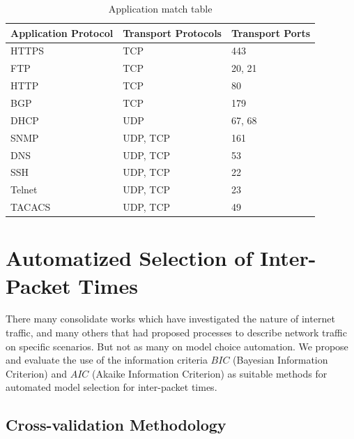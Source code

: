 \begin{table}[ht!]
    \centering
    \caption{Application match table}
    \label{tab:application-protocols}
    \begin{tabular}{lll}
        \hline
        Application Protocol & Transport Protocols & Transport Ports \\ \hline
        \acrshort{HTTPS}               & TCP                & 443             \\
        FTP                 & TCP                & 20, 21          \\
        HTTP                & TCP                & 80              \\
        \acrshort{BGP}                 & TCP                & 179             \\
        \acrshort{DHCP}                & UDP                & 67, 68          \\
        \acrshort{SNMP}                & UDP, TCP           & 161             \\
        \acrshort{DNS}                 & UDP, TCP           & 53              \\
        \acrshort{SSH}                 & UDP, TCP           & 22              \\
        Telnet              & UDP, TCP           & 23              \\
        \acrshort{TACACS}              & UDP, TCP           & 49              \\ \hline
    \end{tabular}
\end{table}


\section{Automatized Selection of Inter-Packet Times}



There many consolidate works which have investigated the nature of internet traffic, and many others that had proposed processes to describe network traffic on specific scenarios. But not as many on model choice automation.  We propose and evaluate the use of the information criteria $BIC$ (Bayesian Information Criterion) and $AIC$ (Akaike Information Criterion) as suitable methods for automated model selection for inter-packet times.  


\subsection{Cross-validation Methodology}

